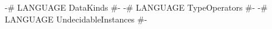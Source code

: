 \begin{code}
{-# LANGUAGE DataKinds            #-}
{-# LANGUAGE TypeOperators        #-}
{-# LANGUAGE UndecidableInstances #-}
\end{code}
